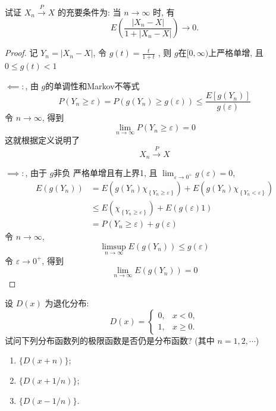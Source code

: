 \documentclass[../main.tex]{subfiles}
\begin{document}
\begin{exercise}{}{}
试证 $X_n \xrightarrow{P} X$ 的充要条件为: 当 $n \to \infty$ 时, 有
\[
E\left(\frac{|X_n - X|}{1 + |X_n - X|}\right) \to 0.
\]
\end{exercise}

\begin{proof}
     记 \(  Y_{n}= \left| X_{n}-X \right|   \), 令 \(  g\left( t \right)= \frac{t }{1+ t }    \)  , 则 \(  g  \)在\(  [0,\infty)  \)上严格单增, 且 \(  0\le g\left( t \right)< 1   \)   


     \(  \impliedby  :  \),  由 \(  g  \)的单调性和Markov不等式  \[
     P\left( Y_{n}\ge  \varepsilon  \right)= P\left( g\left( Y_{n} \right)\ge g\left(  \varepsilon  \right)   \right) \le \frac{E[g\left( Y_{n} \right) ] }{g\left(  \varepsilon  \right)  } 
     \]令 \(  n\to \infty  \), 得到 \[
   \lim_{n\to \infty}  P\left( Y_{n}\ge  \varepsilon  \right)= 0 
     \]这就根据定义说明了 \[
    X_n \xrightarrow{P} X
     \] 

     \(  \implies :  \), 由于 \(  g  \)非负 严格单增且有上界1, 且 \(  \lim_{ \varepsilon \to 0^{+ }}g\left(  \varepsilon  \right) = 0  \),    \[
  \begin{aligned}
     E\left( g\left( Y_{n} \right)  \right)&= E\left( g\left( Y_{n} \right)\chi _{\left\{ Y_{n}\ge  \varepsilon  \right\}}  \right)+ E\left( g\left( Y_{n} \right)\chi _{\left\{ Y_{n}<  \varepsilon  \right\}}  \right)    \\ 
      &\le E\left( \chi _{\left\{ Y_{n}\ge  \varepsilon  \right\}} \right)+ E\left( g\left(  \varepsilon  \right)1 \right)\\ 
       &= P\left( Y_{n}\ge  \varepsilon  \right)   + g\left(  \varepsilon  \right) 
  \end{aligned}
     \]令 \(  n\to \infty  \), \[
     \limsup_{n\to \infty}E\left( g\left( Y_{n} \right)  \right)\le  g\left(  \varepsilon  \right)  
     \] 令 \(   \varepsilon \to 0^{+ }  \), 得到 \[
     \lim_{n\to \infty}E\left( g\left( Y_{n} \right)  \right)= 0 
     \] 
\end{proof}
\begin{exercise}{}{}
设 $D(x)$ 为退化分布:
\[
D(x) = \begin{cases} 0, & x < 0, \\ 1, & x \ge 0. \end{cases}
\]
试问下列分布函数列的极限函数是否仍是分布函数? (其中 $n=1, 2, \cdots$)
\begin{enumerate}
\item $\{D(x+n)\}$;
\item $\{D(x+1/n)\}$;
\item $\{D(x-1/n)\}$.
\end{enumerate}
\end{exercise}
\end{document}
